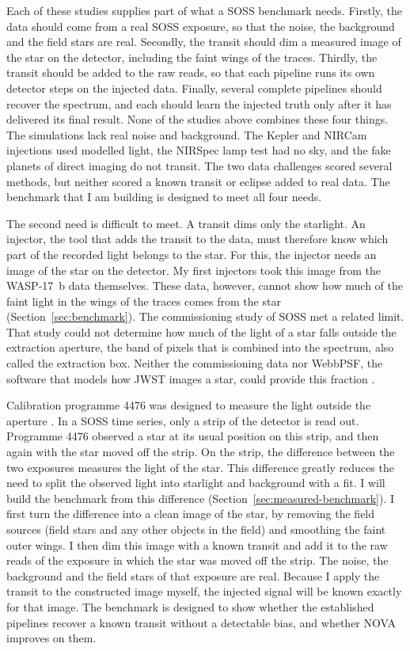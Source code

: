 Each of these studies supplies part of what a SOSS benchmark needs. Firstly,
the data should come from a real SOSS exposure, so that the noise, the
background and the field stars are real. Secondly, the transit should dim a
measured image of the star on the detector, including the faint wings of the
traces. Thirdly, the transit should be added to the raw reads, so that each
pipeline runs its own detector steps on the injected data. Finally, several
complete pipelines should recover the spectrum, and each should learn the
injected truth only after it has delivered its final result. None of the
studies above combines these four things. The simulations lack real noise and
background. The Kepler and NIRCam injections used modelled light, the NIRSpec
lamp test had no sky, and the fake planets of direct imaging do not transit.
The two data challenges scored several methods, but neither scored a known
transit or eclipse added to real data. The benchmark that I am building is
designed to meet all four needs.

The second need is difficult to meet. A transit dims only the starlight. An
injector, the tool that adds the transit to the data, must therefore know
which part of the recorded light belongs to the star. For this, the injector
needs an image of the star on the detector. My first injectors took this image
from the WASP-17~b data themselves. These data, however, cannot show how much
of the faint light in the wings of the traces comes from the star
(Section~\ref{sec:benchmark}). The commissioning study of SOSS met a related
limit. That study could not determine how much of the light of a star falls
outside the extraction aperture, the band of pixels that is combined into the spectrum, also called the extraction box. Neither the commissioning data nor WebbPSF, the software that models
how JWST images a star, could provide this fraction \citep{AlbertEtAl2023}.

Calibration programme 4476 was designed to measure the light outside the
aperture \citep{VolkEspinoza2023}. In a SOSS time series, only a strip of the
detector is read out. Programme 4476 observed a star at its usual position on
this strip, and then again with the star moved off the strip. On the strip,
the difference between the two exposures measures the light of the star. This
difference greatly reduces the need to split the observed light into
starlight and background with a fit. I will build the benchmark from this
difference (Section~\ref{sec:measured-benchmark}). I first turn the difference into a clean image of the star, by removing the field sources (field stars and any other objects in the field) and smoothing the faint outer wings. I then dim this image with a known
transit and add it to the raw reads of the exposure in which the star was
moved off the strip. The noise, the background and the field stars of that
exposure are real. Because I apply the transit to the constructed image
myself, the injected signal will be known exactly for that image. The
benchmark is designed to show whether the established pipelines recover a
known transit without a detectable bias, and whether NOVA improves on them.

